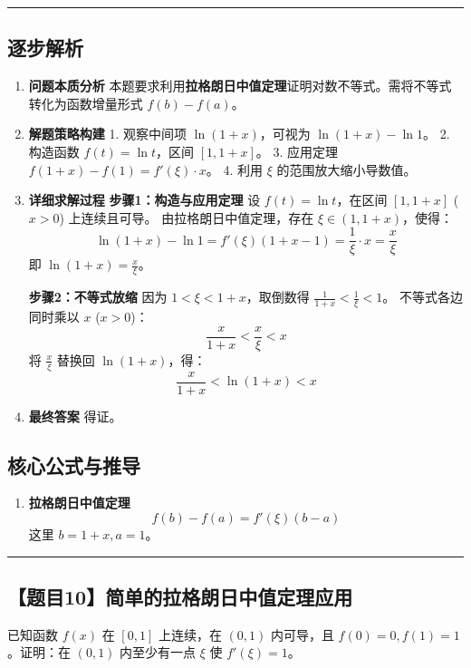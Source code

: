 \documentclass[UTF8]{ctexart}
\newenvironment{redenv}{\color{red}}{}
\newenvironment{detailedanalysis}{%
    \color{red}
    \begin{enumerate}[label=\textbf{第\arabic*步：}, leftmargin=*, align=left, itemsep=1.5ex]
}{%
    \end{enumerate}
}
\newenvironment{formuladerivation}{%
    \begin{enumerate}[label={\textbf{公式\arabic*：}}, leftmargin=*, align=left]
}{%
    \end{enumerate}
}
\newcommand{\problemrule}{\noindent\rule{\textwidth}{1.5pt}\vspace{-0.8em}}
\newcommand{\analysisrule}{\noindent\rule{\textwidth}{0.8pt}\vspace{-0.8em}}
\begin{document}
\begin{redenv}
\analysisrule
\subsection*{逐步解析}

\begin{detailedanalysis}
\item \textbf{问题本质分析}
本题要求利用\textbf{拉格朗日中值定理}证明对数不等式。需将不等式转化为函数增量形式 $f(b)-f(a)$。

\item \textbf{解题策略构建}
1. 观察中间项 $\ln(1+x)$，可视为 $\ln(1+x) - \ln 1$。
2. 构造函数 $f(t) = \ln t$，区间 $[1, 1+x]$。
3. 应用定理 $f(1+x) - f(1) = f'(\xi) \cdot x$。
4. 利用 $\xi$ 的范围放大缩小导数值。

\item \textbf{详细求解过程}
\noindent\textbf{步骤1：构造与应用定理}
设 $f(t) = \ln t$，在区间 $[1, 1+x]$ ($x>0$) 上连续且可导。
由拉格朗日中值定理，存在 $\xi \in (1, 1+x)$，使得：
\[ \ln(1+x) - \ln 1 = f'(\xi)(1+x - 1) = \frac{1}{\xi} \cdot x = \frac{x}{\xi} \]
即 $\ln(1+x) = \frac{x}{\xi}$。

\noindent\textbf{步骤2：不等式放缩}
因为 $1 < \xi < 1+x$，取倒数得 $\frac{1}{1+x} < \frac{1}{\xi} < 1$。
不等式各边同时乘以 $x$ ($x>0$)：
\[ \frac{x}{1+x} < \frac{x}{\xi} < x \]
将 $\frac{x}{\xi}$ 替换回 $\ln(1+x)$，得：
\[ \frac{x}{1+x} < \ln(1+x) < x \]

\item \textbf{最终答案}
得证。
\end{detailedanalysis}

\subsection*{核心公式与推导}
\begin{formuladerivation}
\item \textbf{拉格朗日中值定理}
\[ f(b) - f(a) = f'(\xi)(b-a) \]
这里 $b=1+x, a=1$。
\end{formuladerivation}
\end{redenv}

\vspace{2em}
\problemrule
\subsection*{【题目10】简单的拉格朗日中值定理应用}
已知函数 $f(x)$ 在 $[0, 1]$ 上连续，在 $(0, 1)$ 内可导，且 $f(0)=0, f(1)=1$。证明：在 $(0, 1)$ 内至少有一点 $\xi$ 使 $f'(\xi)=1$。
\end{document}
